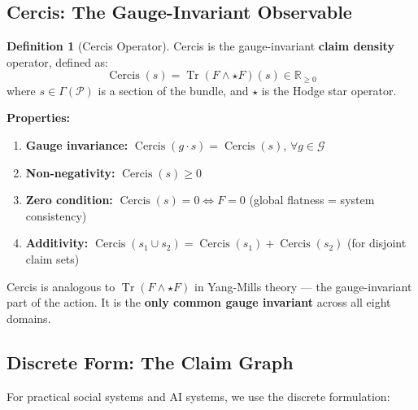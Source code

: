 \documentclass[12pt,a4paper]{article}
\theoremstyle{plain}
\theoremstyle{definition}
\newtheorem{definition}[theorem]{Definition}
\newcommand{\R}{\mathbb{R}}
\newcommand{\Gauge}{\mathcal{G}}
\newcommand{\Pcal}{\mathcal{P}}
\newcommand{\curv}{F}
\DeclareMathOperator{\Tr}{Tr}
\begin{document}
\subsection{Cercis: The Gauge-Invariant Observable}

\begin{definition}[Cercis Operator]
Cercis is the gauge-invariant \textbf{claim density} operator, defined as:
\begin{equation}
    \operatorname{Cercis}(s) = \Tr\left(\curv \wedge \star \curv\right)(s) \in \R_{\geq 0}
\end{equation}
where $s \in \Gamma(\Pcal)$ is a section of the bundle, and $\star$ is the Hodge star operator.

\textbf{Properties:}
\begin{enumerate}[label=(\roman*)]
    \item \textbf{Gauge invariance:} $\operatorname{Cercis}(g \cdot s) = \operatorname{Cercis}(s)$, $\forall g \in \Gauge$
    \item \textbf{Non-negativity:} $\operatorname{Cercis}(s) \geq 0$
    \item \textbf{Zero condition:} $\operatorname{Cercis}(s) = 0 \iff F = 0$ (global flatness = system consistency)
    \item \textbf{Additivity:} $\operatorname{Cercis}(s_1 \cup s_2) = \operatorname{Cercis}(s_1) + \operatorname{Cercis}(s_2)$ (for disjoint claim sets)
\end{enumerate}

Cercis is analogous to $\Tr(F \wedge \star F)$ in Yang-Mills theory — the gauge-invariant part of the action.
It is the \textbf{only common gauge invariant} across all eight domains.
\end{definition}

\subsection{Discrete Form: The Claim Graph}

For practical social systems and AI systems, we use the discrete formulation:
\end{document}
